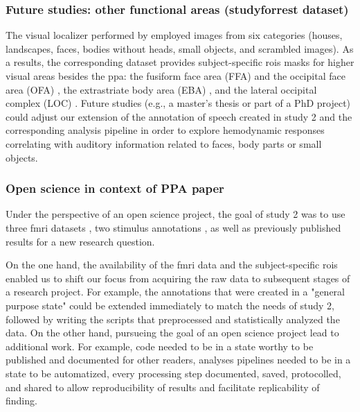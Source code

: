 

\subsubsection{Future studies: other functional areas (studyforrest dataset)}


The visual localizer performed by \citet{sengupta2016extension} employed images
from six categories (houses, landscapes, faces, bodies without heads, small
objects, and scrambled images).
%
As a results, the corresponding dataset provides subject-specific \acp{roi}
masks for higher visual areas besides the \ac{ppa}:
%
the fusiform face area (FFA) \citep{kanwisher1997ffa} and the occipital face
area (OFA) \citep{pitcher2011occipitalfacearea},
%
the extrastriate body area (EBA) \citep{downing2001bodyarea},
%
and the lateral occipital complex (LOC) \citep{malach1995loc}.
%
Future studies (e.g., a master's thesis or part of a PhD project) could adjust
our extension of the annotation of speech created in study 2 and the
corresponding analysis pipeline in order to explore hemodynamic responses
correlating with auditory information related to faces, body parts or small
objects.


\subsubsection{Open science in context of PPA paper}

Under the perspective of an open science project, the goal of study 2 was to use
three \ac{fmri} datasets \citep{hanke2014audiomovie, hanke2016simultaneous,
sengupta2016extension}, two stimulus annotations \citep{haeusler2021speechanno,
haeusler2016cutanno}, as well as previously published results
\citep{sengupta2016extension} for a new research question.


On the one hand, the availability of the \ac{fmri} data and the subject-specific
\acp{roi} enabled us to shift our focus from acquiring the raw data to
subsequent stages of a research project.
For example, the annotations that were created in a "general purpose state"
could be extended immediately to match the needs of study 2, followed by writing
the scripts that preprocessed and statistically analyzed the data.
On the other hand, pursueing the goal of an open science project lead to
additional work.
For example, code needed to be in a state worthy to be published and documented
for other readers, analyses pipelines needed to be in a state to be automatized,
every processing step documented, saved, protocolled, and shared to allow
reproducibility of results and facilitate replicability of finding.

